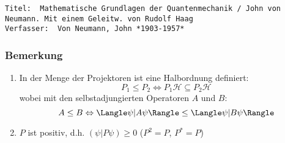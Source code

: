 \documentclass[twoside,a4paper]{scrartcl}
\renewcommand{\1}{\mathds{1}}
\begin{document}
\begin{tiny}
\begin{verbatim}
Titel: 	Mathematische Grundlagen der Quantenmechanik / John von Neumann. Mit einem Geleitw. von Rudolf Haag
Verfasser: 	Von Neumann, John *1903-1957*
\end{verbatim}
\end{tiny}


\subsubsection*{Bemerkung}
\begin{enumerate}
 \item In der Menge der Projektoren ist eine Halbordnung definiert:
$$P_1 \leq P_2 \Leftrightarrow P_1 \mathcal H \subseteq P_2  \mathcal H$$
wobei mit den selbstadjungierten Operatoren $A$ und $B$:
$$A \leq B \Leftrightarrow \Langle \psi|A\psi\Rangle  \leq \Langle \psi|B\psi\Rangle $$
 \item $P$ ist positiv, d.h. $(\psi|P\psi)\geq 0$ ($P^2=P$, $P^*=P$)
\end{enumerate}
\end{document}
